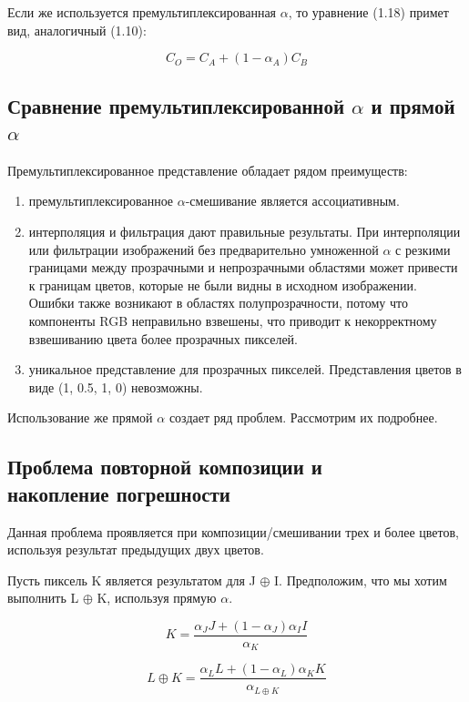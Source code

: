 Если же используется премультиплексированная $\alpha$, то уравнение (1.18) примет вид, аналогичный (1.10): 

\begin{equation}
C_{O} = C_{A} + (1-\alpha_{A})C_{B}
\end{equation}

\subsection{Сравнение премультиплексированной  $\alpha$ и прямой $\alpha$}
Премультиплексированное представление обладает рядом преимуществ: 
\begin{enumerate}
	\item премультиплексированное $\alpha$-смешивание является ассоциативным.
	\item интерполяция и фильтрация дают правильные результаты. При интерполяции или фильтрации изображений без предварительно умноженной $\alpha$ с резкими границами между прозрачными и непрозрачными областями  может привести к границам цветов, которые не были видны в исходном изображении. Ошибки также возникают в областях полупрозрачности, потому что компоненты RGB неправильно взвешены, что приводит к некорректному взвешиванию цвета более прозрачных пикселей.
	\item уникальное представление для прозрачных пикселей. Представления цветов в виде (1, 0.5, 1, 0) невозможны.
\end{enumerate}
Использование же прямой $\alpha$ создает ряд проблем. Рассмотрим их подробнее.
 
\subsection{Проблема повторной композиции и \\ накопление погрешности}
Данная проблема проявляется при композиции/смешивании трех и более цветов, используя результат предыдущих двух цветов.

Пусть пиксель K является результатом для  J $\oplus$ I. Предположим, что мы хотим выполнить L $\oplus$ K, используя прямую $\alpha$.

\begin{equation}
K = \frac{\alpha_{J}J + (1-\alpha_{J})\alpha_{I}I}{\alpha_{K}}
\end{equation}

\begin{equation}
L \oplus K = \frac{\alpha_{L}L + (1-\alpha_{L})\alpha_{K}K}{\alpha_{L \oplus K}}
\end{equation}

